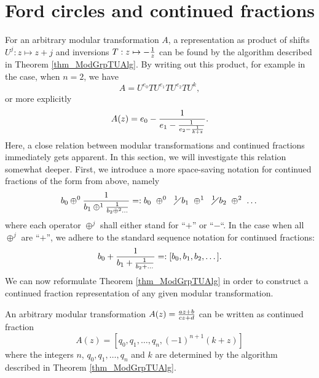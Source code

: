 \section{Ford circles and continued fractions}

For an arbitrary modular transformation $A$, a representation as product of shifts $U^j: z \mapsto z+j$ and inversions $T: z \mapsto -\reci{z}$ can be found by the algorithm described in Theorem \ref{thm_ModGrpTUAlg}. By writing out this product, for example in the case, when $n=2$, we have
\begin{equation*}
A = U^{e_0}T U^{e_1}T U^{e_2}T U^k,
\end{equation*}
or more explicitly
\begin{equation*}
A(z) = e_0 - \reci{e_1 - \reci{e_2 - \reci{k + z}}}.
\end{equation*}
Here, a close relation between modular transformations and continued fractions immediately gets apparent. In this section, we will investigate this relation somewhat deeper. 
First, we introduce a more space-saving notation for continued fractions of the form from above, namely
\begin{equation}
\label{eqn_ConFracNotation}
b_0 \oplus^0 \reci{b_1 \oplus^1 \reci{b_2 \oplus^2 \dots}} =: 
b_0 \ \oplus^0 \ \confr{b_1} \ \oplus^1 \ \confr{b_2} \ \oplus^2 \ \dots
\end{equation}
where each operator $\oplus^j$ shall either stand for ``$+$'' or ``$-$``. In the case when all $\oplus^j$ are ``$+$'', we adhere to the standard sequence notation for continued fractions:
\begin{equation*}
b_0 + \reci{b_1 + \reci{b_2 + \dots}} =: [b_0,b_1,b_2,\dots].
\end{equation*}
We can now reformulate Theorem \ref{thm_ModGrpTUAlg} in order to construct a continued fraction representation of any given modular transformation.
\begin{lemma}
An arbitrary modular transformation $A(z) = \moebius{a}{b}{c}{d}{z}$ can be written as continued fraction
\begin{equation}
\label{eqn_ModTransConFrac}
A(z) = [q_0,q_1,\dots,q_n,(-1)^{n+1}(k+z)]
\end{equation}
where the integers $n$, $q_0,q_1,\dots,q_n$ and $k$ are determined by the algorithm described in Theorem \ref{thm_ModGrpTUAlg}.
\end{lemma}
